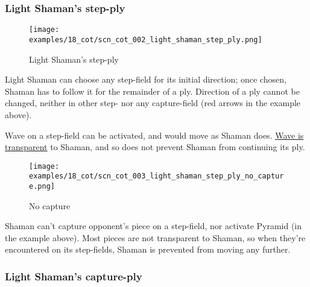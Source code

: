 \clearpage %

\subsubsection*{Light Shaman's step-ply}
\label{sec:Conquest of Tlalocan/Shaman/Movement/Light Shaman's step-ply}

\vspace*{-1.4\baselineskip}
\noindent
\begin{figure}[!h]
\texttt{[image: examples/18\_cot/scn\_cot\_002\_light\_shaman\_step\_ply.png]}
\vspace*{-1.4\baselineskip}
\caption{Light Shaman's step-ply}
\label{fig:scn_cot_002_light_shaman_step_ply}
\end{figure}

\vspace*{-0.4\baselineskip}
Light Shaman can choose any step-field for its initial direction; once chosen, Shaman
has to follow it for the remainder of a ply. Direction of a ply cannot be changed,
neither in other step- nor any capture-field (red arrows in the example above).

Wave on a step-field can be activated, and would move as Shaman does.
\hyperref[fig:scn_mv_07_wave_is_transparent]{Wave is transparent} to Shaman, and
so does not prevent Shaman from continuing its ply.

\noindent
\begin{wrapfigure}[8]{l}{0.4\textwidth}
\centering
\texttt{[image: examples/18\_cot/scn\_cot\_003\_light\_shaman\_step\_ply\_no\_capture.png]}
\vspace*{-1.4\baselineskip}
\caption{No capture}
\label{fig:scn_cot_003_light_shaman_step_ply_no_capture}
\end{wrapfigure}
Shaman can't capture opponent's piece on a step-field, nor activate Pyramid (in
the example above). Most pieces are not transparent to Shaman, so when they're
encountered on its step-fields, Shaman is prevented from moving any further.

\clearpage %

\subsubsection*{Light Shaman's capture-ply}
\label{sec:Conquest of Tlalocan/Shaman/Movement/Light Shaman's capture-ply}

